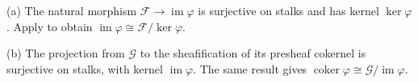(a) The natural morphism $\mathscr F\to\operatorname{im}\varphi$ is surjective on stalks and has kernel $\ker\varphi$. Apply  to obtain $\operatorname{im}\varphi\cong\mathscr F/\ker\varphi$.

(b) The projection from $\mathscr G$ to the sheafification of its presheaf cokernel is surjective on stalks, with kernel $\operatorname{im}\varphi$. The same result gives $\operatorname{coker}\varphi\cong\mathscr G/\operatorname{im}\varphi$.
